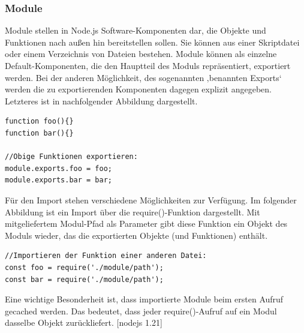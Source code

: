 \newpage
\subsubsection{Module}

Module stellen in Node.js Software-Komponenten dar, die Objekte und Funktionen nach außen hin bereitstellen sollen. 
Sie können aus einer Skriptdatei oder einem Verzeichnis von Dateien bestehen. Module können als einzelne Default-Komponenten, die den Hauptteil des Moduls repräsentiert, exportiert werden. 
Bei der anderen Möglichkeit, des sogenannten ‚benannten Exports‘ werden die zu exportierenden Komponenten dagegen explizit angegeben. Letzteres ist in nachfolgender Abbildung dargestellt. 
\newline
  
    
\begin{lstlisting}[caption=Benannter Export von Modulen,label=lst:ModuleExport]
function foo(){}
function bar(){}

//Obige Funktionen exportieren:
module.exports.foo = foo;
module.exports.bar = bar;
\end{lstlisting}

 
Für den Import stehen verschiedene Möglichkeiten zur Verfügung. 
Im folgender Abbildung ist ein Import über die require()-Funktion dargestellt. 
Mit mitgeliefertem Modul-Pfad als Parameter gibt diese Funktion ein Objekt des Moduls wieder, das die exportierten Objekte (und Funktionen) enthält.
\newline
  
\begin{lstlisting}[caption=Import von Modulen,label=lst:ModuleImport]
//Importieren der Funktion einer anderen Datei:
const foo = require('./module/path');
const bar = require('./module/path');
\end{lstlisting}


Eine wichtige Besonderheit ist, dass importierte Module  beim ersten Aufruf gecached werden. 
Das bedeutet, dass jeder require()-Aufruf auf ein Modul dasselbe Objekt zurückliefert. [nodejs 1.21]


